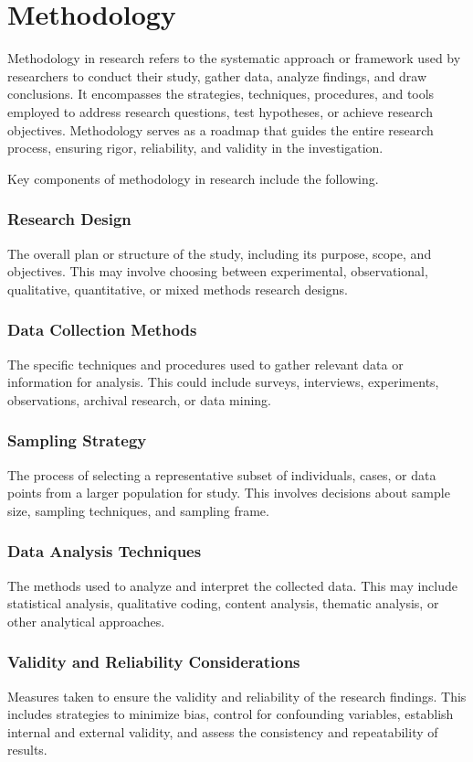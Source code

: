 \chapter{Methodology}
Methodology in research refers to the systematic approach or framework used by researchers to conduct their study, gather data, analyze findings, and draw conclusions.
It encompasses the strategies, techniques, procedures, and tools employed to address research questions, test hypotheses, or achieve research objectives.
Methodology serves as a roadmap that guides the entire research process, ensuring rigor, reliability, and validity in the investigation.

Key components of methodology in research include the following.

\subsection{Research Design}
The overall plan or structure of the study, including its purpose, scope, and objectives.
This may involve choosing between experimental, observational, qualitative, quantitative, or mixed methods research designs.
    
\subsection{Data Collection Methods}
The specific techniques and procedures used to gather relevant data or information for analysis.
This could include surveys, interviews, experiments, observations, archival research, or data mining.
    
\subsection{Sampling Strategy}
The process of selecting a representative subset of individuals, cases, or data points from a larger population for study.
This involves decisions about sample size, sampling techniques, and sampling frame.
    
\subsection{Data Analysis Techniques}
The methods used to analyze and interpret the collected data.
This may include statistical analysis, qualitative coding, content analysis, thematic analysis, or other analytical approaches.
    
\subsection{Validity and Reliability Considerations} 
Measures taken to ensure the validity and reliability of the research findings.
This includes strategies to minimize bias, control for confounding variables, establish internal and external validity, and assess the consistency and repeatability of results.
    
